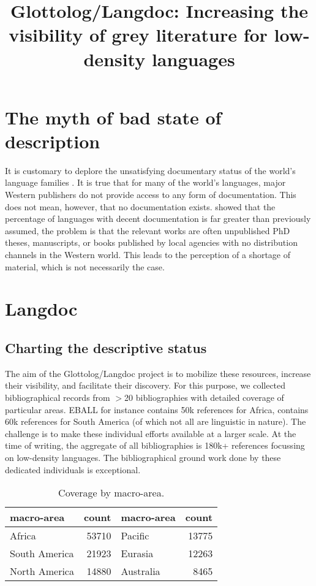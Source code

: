 \documentclass[10pt, a4paper]{article}
\title{Glottolog/Langdoc: Increasing the visibility of grey literature for low-density languages}
\begin{document}
 \maketitleabstract
 

\section{The myth of bad state of description}

It is customary to deplore the unsatisfying documentary status of the
world's language families
\cite{typ:WALS:Intro,el:Krauss:Extinction}. It is true that for many
of the world's languages, major Western publishers do not provide
access to any form of documentation. This does not mean, however, that
no documentation exists. \cite{HammarstroemEtAl2011Howmany} showed that
the percentage of languages with decent documentation is far greater
than previously assumed, the problem is that the relevant works are
often unpublished PhD theses, manuscripts, or books published by local
agencies with no distribution channels in the Western world. This
leads to the perception of a shortage of material, which is not
necessarily the case.

\section{Langdoc}\label{sec:langdoc}
\subsection{Charting the descriptive status}

The aim of the Glottolog/Langdoc project is to mobilize these
resources, increase their visibility, and facilitate their
discovery. For this purpose, we collected bibliographical records from
$>$20 bibliographies with detailed coverage of particular areas. EBALL
\cite{b:Maho:EBALL} for instance contains 50k references for Africa,
\cite{h:Fabre:2005} contains 60k references for South America (of
which not all are linguistic in nature). The challenge is to make
these individual efforts available at a larger scale. At the time of
writing, the aggregate of all bibliographies is 180k+ references
focussing on low-density languages.  The bibliographical ground work
done by these dedicated individuals is exceptional.


\begin{table}
  \begin{tabular}{lr||lr}
    macro-area   & count &  macro-area   & count \\
  \hline
  Africa         & 53710  &   Pacific        & 13775 \\
  South America  & 21923  &   Eurasia        & 12263  \\
  North America  & 14880  &   Australia      &  8465  \\
  \end{tabular}
 \caption{Coverage by macro-area.}
\end{table}
\end{document}
